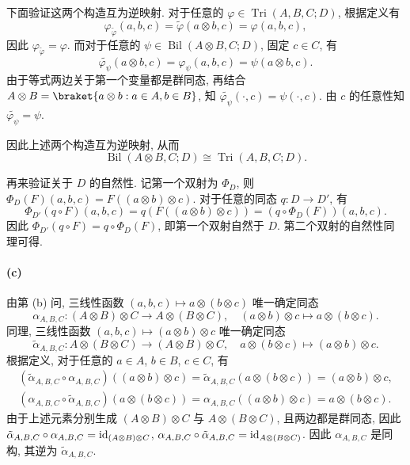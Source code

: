 \documentclass{article}
\begin{document}
\begin{solution}
	下面验证这两个构造互为逆映射. 对于任意的 $\varphi \in \operatorname{Tri}(A, B, C; D)$, 根据定义有
	\[ \varphi_{\tilde{\varphi}}(a, b, c) = \tilde{\varphi}(a \otimes b, c) = \varphi(a, b, c), \]
	因此 $\varphi_{\tilde{\varphi}} = \varphi$. 而对于任意的 $\psi \in \operatorname{Bil}(A \otimes B, C; D)$, 固定 $c \in C$, 有
	\[ \widetilde{\varphi_\psi}(a \otimes b, c) = \varphi_\psi(a, b, c) = \psi(a \otimes b, c). \]
	由于等式两边关于第一个变量都是群同态, 再结合 $A \otimes B = \braket{a \otimes b: a \in A, b \in B}$, 知 $\widetilde{\varphi_\psi}(\cdot, c) = \psi(\cdot, c)$. 由 $c$ 的任意性知 $\widetilde{\varphi_\psi} = \psi$.

	因此上述两个构造互为逆映射, 从而
	\[ \operatorname{Bil}(A \otimes B, C; D) \cong \operatorname{Tri}(A, B, C; D). \]

	再来验证关于 $D$ 的自然性. 记第一个双射为 $\Phi_D$, 则 $\Phi_D(F)(a,b,c) = F((a \otimes b) \otimes c)$. 对于任意的同态 $q: D \to D'$, 有
	\[ \Phi_{D'}(q \circ F)(a,b,c) = q(F((a \otimes b) \otimes c)) = (q \circ \Phi_D(F))(a,b,c). \]
	因此 $\Phi_{D'}(q \circ F) = q \circ \Phi_D(F)$, 即第一个双射自然于 $D$. 第二个双射的自然性同理可得.

	\paragraph{(c)} 由第 (b) 问, 三线性函数 $(a, b, c) \mapsto a \otimes (b \otimes c)$ 唯一确定同态
	\[ \alpha_{A, B, C}: (A \otimes B) \otimes C \to A \otimes (B \otimes C), \quad (a \otimes b) \otimes c \mapsto a \otimes (b \otimes c). \]
	同理, 三线性函数 $(a, b, c) \mapsto (a \otimes b) \otimes c$ 唯一确定同态
	\[ \tilde{\alpha}_{A, B, C}: A \otimes (B \otimes C) \to (A \otimes B) \otimes C, \quad a \otimes (b \otimes c) \mapsto (a \otimes b) \otimes c. \]
	根据定义, 对于任意的 $a \in A$, $b \in B$, $c \in C$, 有
	\begin{gather*}
		(\tilde{\alpha}_{A, B, C} \circ \alpha_{A, B, C})((a \otimes b) \otimes c)
		= \tilde{\alpha}_{A, B, C}(a \otimes (b \otimes c)) = (a \otimes b) \otimes c, \\
		(\alpha_{A, B, C} \circ \tilde{\alpha}_{A, B, C})(a \otimes (b \otimes c))
		= \alpha_{A, B, C}((a \otimes b) \otimes c) = a \otimes (b \otimes c).
	\end{gather*}
	由于上述元素分别生成 $(A \otimes B) \otimes C$ 与 $A \otimes (B \otimes C)$, 且两边都是群同态, 因此 $\tilde{\alpha}_{A, B, C} \circ \alpha_{A, B, C} = \operatorname{id}_{(A \otimes B) \otimes C}$, $\alpha_{A, B, C} \circ \tilde{\alpha}_{A, B, C} = \operatorname{id}_{A \otimes (B \otimes C)}$. 因此 $\alpha_{A, B, C}$ 是同构, 其逆为 $\tilde{\alpha}_{A, B, C}$.


\end{solution}
\end{document}
